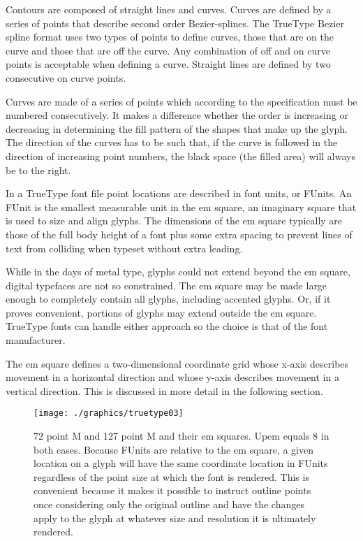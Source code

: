 \begin{multicols}{2}
Contours are composed of straight lines and curves. Curves are defined by a series of points that describe second order Bezier-splines. The TrueType Bezier spline format uses two types of points to define curves, those that are on the curve and those that are off the curve. Any combination of off and on curve points is acceptable when defining a curve. Straight lines are defined by two consecutive on curve points.


Curves are made of a series of points which according to the specification must be numbered consecutively. It makes a difference whether the order is increasing or decreasing in determining the fill pattern of the shapes that make up the glyph. The direction of the curves has to be such that, if the curve is followed in the direction of increasing point numbers, the black space (the filled area) will always be to the right. 


In a TrueType font file point locations are described in font units, or FUnits. An FUnit is the smallest measurable unit in the em square, an imaginary square that is used to size and align glyphs. The dimensions of the em square typically are those of the full body height of a font plus some extra spacing to prevent lines of text from colliding when typeset without extra leading.



While in the days of metal type, glyphs could not extend beyond the em square, digital typefaces are not so constrained. The em square may be made large enough to completely contain all glyphs, including accented glyphs. Or, if it proves convenient, portions of glyphs may extend outside the em square. TrueType fonts can handle either approach so the choice is that of the font manufacturer.

The em square defines a two-dimensional coordinate grid whose x-axis describes movement in a horizontal direction and whose y-axis describes movement in a vertical direction. This is discussed in more detail in the following section.

\end{multicols}

\begin{figure}[htbp]%
  \centering 
  \texttt{[image: ./graphics/truetype03]}
  \caption{72 point M and 127 point M and their em squares.
Upem equals 8 in both cases. Because FUnits are relative to the em square, a given location on a glyph will have the same coordinate location in FUnits regardless of the point size at which the font is rendered. This is convenient because it makes it possible to instruct outline points once considering only the original outline and have the changes apply to the glyph at whatever size and resolution it is ultimately rendered.}
  \label{fig:truetype03}
\end{figure}











